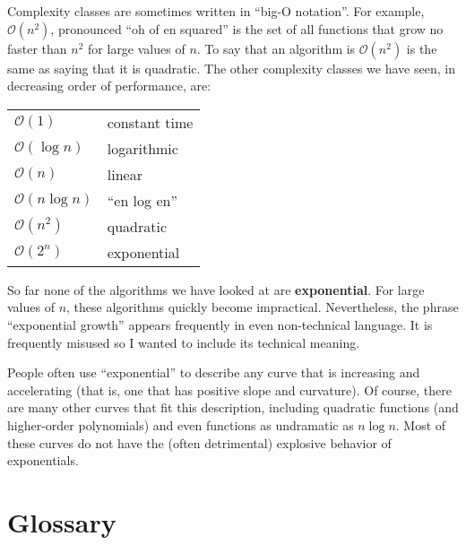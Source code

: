 
Complexity classes are sometimes written in ``big-O notation''.
For example, $\mathcal{O} (n^2)$, pronounced ``oh of
en squared'' is the set of all functions that grow no faster
than $n^2$ for large values of $n$.  To say that an algorithm
is $\mathcal{O} (n^2)$ is the same as saying that it
is quadratic.  The other complexity classes we have seen,
in decreasing order of performance, are:

\vspace {0.2in}
\begin{tabular}{ll}
$\mathcal{O} (1)$          &  constant time  \\
$\mathcal{O} (\log n)$     &  logarithmic  \\
$\mathcal{O} (n)$          &  linear  \\
$\mathcal{O} (n \log n)$   &  ``en log en''  \\
$\mathcal{O} (n^2)$        &  quadratic  \\
$\mathcal{O} (2^n)$        &  exponential
\end{tabular}
\vspace {0.2in}

So far none of the algorithms we have looked at are {\bf exponential}.
For large values of $n$, these algorithms quickly become impractical.
Nevertheless, the phrase ``exponential growth'' appears frequently in
even non-technical language.  It is frequently misused so I wanted to
include its technical meaning.

People often use ``exponential'' to describe any curve that is
increasing and accelerating (that is, one that has positive slope and
curvature).  Of course, there are many other curves that fit this
description, including quadratic functions (and higher-order
polynomials) and even functions as undramatic as $n \log n$.  Most
of these curves do not have the (often detrimental) explosive
behavior of exponentials.


\section{Glossary}

